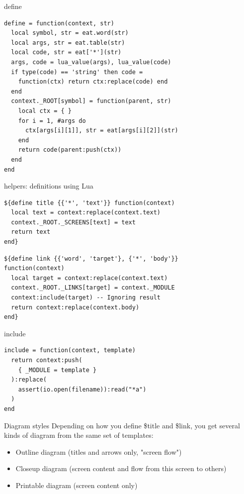 \documentclass[aspectratio=43,handout,bigger]{beamer}
\begin{document}

\begin{frame}[fragile]{define}
\begin{verbatim}
define = function(context, str)
  local symbol, str = eat.word(str)
  local args, str = eat.table(str)
  local code, str = eat['*'](str)
  args, code = lua_value(args), lua_value(code)
  if type(code) == 'string' then code =
    function(ctx) return ctx:replace(code) end
  end
  context._ROOT[symbol] = function(parent, str)
    local ctx = { }
    for i = 1, #args do
      ctx[args[i][1]], str = eat[args[i][2]](str)
    end
    return code(parent:push(ctx))
  end
end
\end{verbatim}
\end{frame}


\begin{frame}[fragile]{helpers: definitions using Lua}
\begin{verbatim}
${define title {{'*', 'text'}} function(context)
  local text = context:replace(context.text)
  context._ROOT._SCREENS[text] = text
  return text
end}
\end{verbatim}

\begin{verbatim}
${define link {{'word', 'target'}, {'*', 'body'}}
function(context)
  local target = context:replace(context.text)
  context._ROOT._LINKS[target] = context._MODULE
  context:include(target) -- Ignoring result
  return context:replace(context.body)
end}
\end{verbatim}
\end{frame}


\begin{frame}[fragile]{include}
\begin{verbatim}
include = function(context, template)
  return context:push(
    { _MODULE = template }
  ):replace(
    assert(io.open(filename)):read("*a")
  )
end
\end{verbatim}
\end{frame}


\begin{frame}{Diagram styles}
  Depending on how you define \${title} and \${link},
  you get several kinds of diagram from the same set of templates:

  \begin{itemize}
    \item Outline diagram (titles and arrows only, "screen flow")
    \item Closeup diagram (screen content and flow from this screen to others)
    \item Printable diagram (screen content only)
  \end{itemize}
\end{frame}
\end{document}
